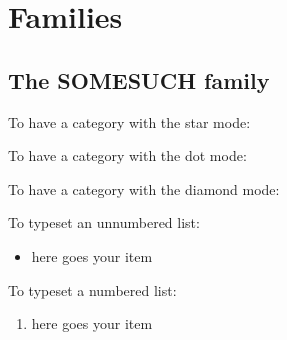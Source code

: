 \section{Families}

\subsection{The SOMESUCH family}



To have a category with the star mode: 

To have a category with the dot mode:  

To have a category with the diamond mode:  

To typeset an unnumbered list: 

\begin{itemize}
\item here goes your item
\end{itemize}

To typeset a numbered list: 

\begin{enumerate}
\item here goes your item
\end{enumerate}